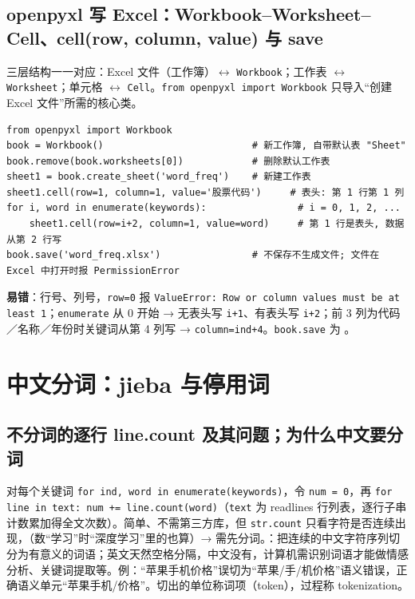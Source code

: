 \subsection{openpyxl 写 Excel：Workbook–Worksheet–Cell、cell(row, column, value) 与 save}
三层结构一一对应：Excel 文件（工作簿）$\leftrightarrow$ \texttt{Workbook}；工作表 $\leftrightarrow$ \texttt{Worksheet}；单元格 $\leftrightarrow$ \texttt{Cell}。\texttt{from openpyxl import Workbook} 只导入“创建 Excel 文件”所需的核心类。
\begin{lstlisting}[style=pyD08a]
from openpyxl import Workbook
book = Workbook()                          # 新工作簿, 自带默认表 "Sheet"
book.remove(book.worksheets[0])            # 删除默认工作表
sheet1 = book.create_sheet('word_freq')    # 新建工作表
sheet1.cell(row=1, column=1, value='股票代码')     # 表头: 第 1 行第 1 列
for i, word in enumerate(keywords):                # i = 0, 1, 2, ...
    sheet1.cell(row=i+2, column=1, value=word)     # 第 1 行是表头, 数据从第 2 行写
book.save('word_freq.xlsx')                # 不保存不生成文件; 文件在 Excel 中打开时报 PermissionError
\end{lstlisting}
\textbf{易错}：行号、列号，\texttt{row=0} 报 \texttt{ValueError: Row or column values must be at least 1}；\texttt{enumerate} 从 0 开始 → 无表头写 \texttt{i+1}、有表头写 \texttt{i+2}；前 3 列为代码／名称／年份时关键词从第 4 列写 → \texttt{column=ind+4}。\texttt{book.save} 为 \tagext。

\section{中文分词：jieba 与停用词}

\subsection{不分词的逐行 line.count 及其问题；为什么中文要分词}
对每个关键词 \texttt{for ind, word in enumerate(keywords)}，令 \texttt{num = 0}，再 \texttt{for line in text: num += line.count(word)}（\texttt{text} 为 readlines 行列表，逐行子串计数累加得全文次数）。简单、不需第三方库，但 \texttt{str.count} 只看字符是否连续出现，（数“学习”时“深度学习”里的也算）→ 需先分词。：把连续的中文字符序列切分为有意义的词语；英文天然空格分隔，中文没有，计算机需识别词语才能做情感分析、关键词提取等。例：“苹果手机价格”误切为“苹果/手/机价格”语义错误，正确语义单元“苹果手机/价格”。切出的单位称词项（token），过程称 tokenization。

